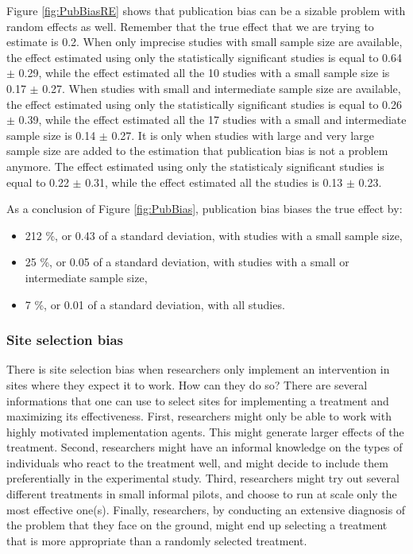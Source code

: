 \documentclass[]{book}
\providecommand{\tightlist}{%
  \setlength{\itemsep}{0pt}\setlength{\parskip}{0pt}}
\theoremstyle{definition}
\theoremstyle{definition}
\theoremstyle{definition}
\theoremstyle{remark}
\begin{document}
Figure \ref{fig:PubBiasRE} shows that publication bias can be a sizable problem with random effects as well.
Remember that the true effect that we are trying to estimate is 0.2.
When only imprecise studies with small sample size are available, the effect estimated using only the statistically significant studies is equal to 0.64 \(\pm\) 0.29, while the effect estimated all the 10 studies with a small sample size is 0.17 \(\pm\) 0.27.
When studies with small and intermediate sample size are available, the effect estimated using only the statistically significant studies is equal to 0.26 \(\pm\) 0.39, while the effect estimated all the 17 studies with a small and intermediate sample size is 0.14 \(\pm\) 0.27.
It is only when studies with large and very large sample size are added to the estimation that publication bias is not a problem anymore.
The effect estimated using only the statisticaly significant studies is equal to 0.22 \(\pm\) 0.31, while the effect estimated all the studies is 0.13 \(\pm\) 0.23.

As a conclusion of Figure \ref{fig:PubBias}, publication bias biases the true effect by:

\begin{itemize}
\tightlist
\item
  212 \%, or 0.43 of a standard deviation, with studies with a small sample size,
\item
  25 \%, or 0.05 of a standard deviation, with studies with a small or intermediate sample size,
\item
  7 \%, or 0.01 of a standard deviation, with all studies.
\end{itemize}

\hypertarget{site-selection-bias-1}{%
\subsubsection{Site selection bias}\label{site-selection-bias-1}}

There is site selection bias when researchers only implement an intervention in sites where they expect it to work.
How can they do so?
There are several informations that one can use to select sites for implementing a treatment and maximizing its effectiveness.
First, researchers might only be able to work with highly motivated implementation agents.
This might generate larger effects of the treatment.
Second, researchers might have an informal knowledge on the types of individuals who react to the treatment well, and might decide to include them preferentially in the experimental study.
Third, researchers might try out several different treatments in small informal pilots, and choose to run at scale only the most effective one(s).
Finally, researchers, by conducting an extensive diagnosis of the problem that they face on the ground, might end up selecting a treatment that is more appropriate than a randomly selected treatment.
\end{document}
